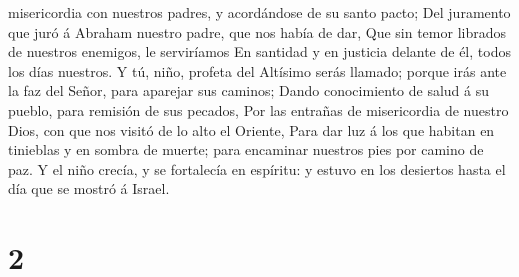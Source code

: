 misericordia con nuestros padres, y acordándose de su santo pacto;
 Del juramento que juró á Abraham nuestro padre, que nos
había de dar,  Que sin temor librados de nuestros enemigos,
le serviríamos  En santidad y en justicia delante de él,
todos los días nuestros.  Y tú, niño, profeta del Altísimo
serás llamado; porque irás ante la faz del Señor, para aparejar sus
caminos;  Dando conocimiento de salud á su pueblo, para
remisión de sus pecados,  Por las entrañas de misericordia
de nuestro Dios, con que nos visitó de lo alto el Oriente, 
Para dar luz á los que habitan en tinieblas y en sombra de muerte; para
encaminar nuestros pies por camino de paz.  Y el niño
crecía, y se fortalecía en espíritu: y estuvo en los desiertos hasta el
día que se mostró á Israel.

\hypertarget{section-1}{%
\section{2}\label{section-1}}

